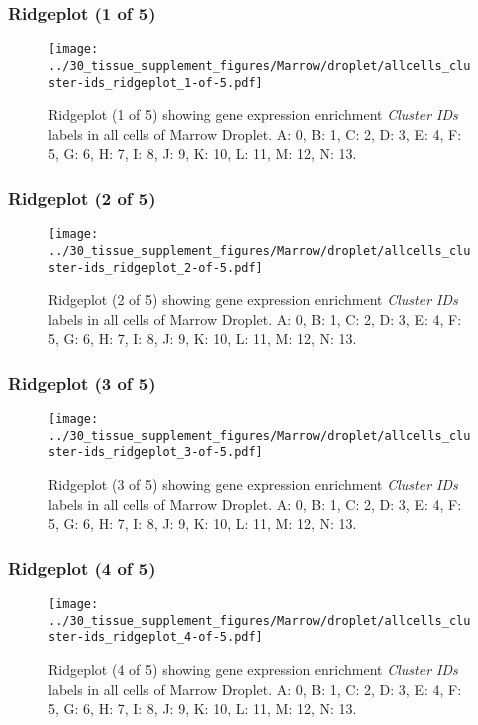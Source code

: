 \clearpage

\subsubsection{Ridgeplot (1 of 5)}
\begin{figure}[h]
\centering
\texttt{[image: ../30\_tissue\_supplement\_figures/Marrow/droplet/allcells\_cluster-ids\_ridgeplot\_1-of-5.pdf]}

\caption{ Ridgeplot (1 of 5)  showing gene expression enrichment \emph{Cluster IDs} labels in all cells of Marrow Droplet. A: 0, B: 1, C: 2, D: 3, E: 4, F: 5, G: 6, H: 7, I: 8, J: 9, K: 10, L: 11, M: 12, N: 13.}
\end{figure}


\clearpage

\subsubsection{Ridgeplot (2 of 5)}
\begin{figure}[h]
\centering
\texttt{[image: ../30\_tissue\_supplement\_figures/Marrow/droplet/allcells\_cluster-ids\_ridgeplot\_2-of-5.pdf]}

\caption{ Ridgeplot (2 of 5)  showing gene expression enrichment \emph{Cluster IDs} labels in all cells of Marrow Droplet. A: 0, B: 1, C: 2, D: 3, E: 4, F: 5, G: 6, H: 7, I: 8, J: 9, K: 10, L: 11, M: 12, N: 13.}
\end{figure}


\clearpage

\subsubsection{Ridgeplot (3 of 5)}
\begin{figure}[h]
\centering
\texttt{[image: ../30\_tissue\_supplement\_figures/Marrow/droplet/allcells\_cluster-ids\_ridgeplot\_3-of-5.pdf]}

\caption{ Ridgeplot (3 of 5)  showing gene expression enrichment \emph{Cluster IDs} labels in all cells of Marrow Droplet. A: 0, B: 1, C: 2, D: 3, E: 4, F: 5, G: 6, H: 7, I: 8, J: 9, K: 10, L: 11, M: 12, N: 13.}
\end{figure}


\clearpage

\subsubsection{Ridgeplot (4 of 5)}
\begin{figure}[h]
\centering
\texttt{[image: ../30\_tissue\_supplement\_figures/Marrow/droplet/allcells\_cluster-ids\_ridgeplot\_4-of-5.pdf]}

\caption{ Ridgeplot (4 of 5)  showing gene expression enrichment \emph{Cluster IDs} labels in all cells of Marrow Droplet. A: 0, B: 1, C: 2, D: 3, E: 4, F: 5, G: 6, H: 7, I: 8, J: 9, K: 10, L: 11, M: 12, N: 13.}
\end{figure}



